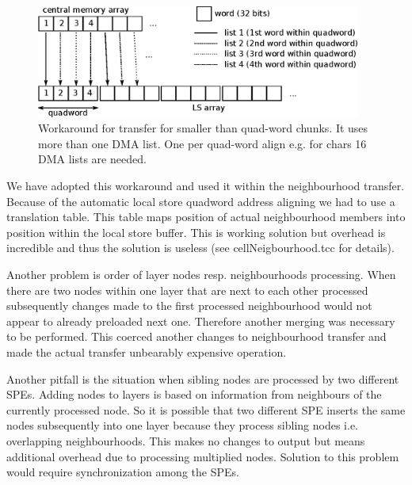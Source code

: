 \begin{figure}
    \centering
    \includegraphics[width=0.95\textwidth]{data/multipleDMAList}
    \caption[Multiple DMA list workaround]
{
  Workaround for transfer for smaller than quad-word chunks.
  It uses more than one DMA list.
  One per quad-word align e.g. for chars 16 DMA lists are needed.
}
    \label{fg:multipleDMAList}
\end{figure}

We have adopted this workaround and used it within the neighbourhood transfer.
Because of the automatic local store quadword address aligning we had to use a translation table.
This table maps position of actual neighbourhood members into position within the local store buffer.
This is working solution but overhead is incredible and thus the solution is useless (see cellNeigbourhood.tcc for details).

\par
\label{neighbourhoodDependecy}
Another problem is order of layer nodes resp. neighbourhoods processing.
When there are two nodes within one layer that are next to each other processed subsequently changes made to the first processed neighbourhood would not appear to already preloaded next one.
Therefore another merging was necessary to be performed.
This coerced another changes to neighbourhood transfer and made the actual transfer unbearably expensive operation.

\par
\label{workDependecy}
Another pitfall is the situation when sibling nodes are processed by two different SPEs.
Adding nodes to layers is based on information from neighbours of the currently processed node.
So it is possible that two different SPE inserts the same nodes subsequently into one layer because they process sibling nodes i.e. overlapping neighbourhoods.
This makes no changes to output but means additional overhead due to processing multiplied nodes.
Solution to this problem would require synchronization among the SPEs.

